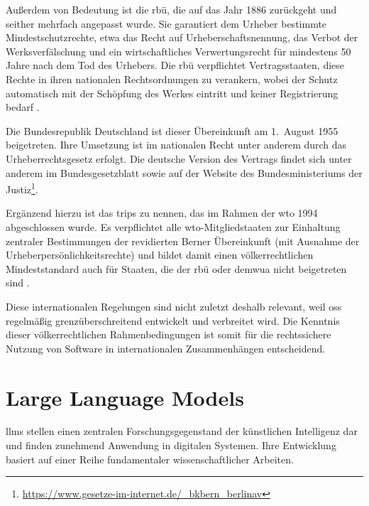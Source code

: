Außerdem von Bedeutung ist die \gls{rbü}, die auf das Jahr 1886 zurückgeht und seither mehrfach angepasst wurde.
Sie garantiert dem Urheber bestimmte Mindestschutzrechte, etwa das Recht auf Urheberschaftsnennung, das Verbot der Werksverfälschung und ein wirtschaftliches Verwertungsrecht für mindestens 50 Jahre nach dem Tod des Urhebers.
Die \gls{rbü} verpflichtet Vertragsstaaten, diese Rechte in ihren nationalen Rechtsordnungen zu verankern, wobei der Schutz automatisch mit der Schöpfung des Werkes eintritt und keiner Registrierung bedarf \autocite{meckel_definition_nodate-1}.

Die Bundesrepublik Deutschland ist dieser Übereinkunft am 1.\ August 1955 beigetreten.
Ihre Umsetzung ist im nationalen Recht unter anderem durch das Urheberrechtsgesetz erfolgt.
Die deutsche Version des Vertrags findet sich unter anderem im Bundesgesetzblatt sowie auf der Website des Bundesministeriums der Justiz\footnote{\url{https://www.gesetze-im-internet.de/\_bkbern\_berlinav}}.

Ergänzend hierzu ist das \gls{trips} zu nennen, das im Rahmen der \gls{wto} 1994 abgeschlossen wurde.
Es verpflichtet alle \gls{wto}-Mitgliedstaaten zur Einhaltung zentraler Bestimmungen der revidierten Berner Übereinkunft (mit Ausnahme der Urheberpersönlichkeitsrechte) und bildet damit einen völkerrechtlichen Mindeststandard auch für Staaten, die der \gls{rbü} oder dem\gls{wua} nicht beigetreten sind \autocite{malbon_standards_2014}.

Diese internationalen Regelungen sind nicht zuletzt deshalb relevant, weil \gls{oss} regelmäßig grenzüberschreitend entwickelt und verbreitet wird.
Die Kenntnis dieser völkerrechtlichen Rahmenbedingungen ist somit für die rechtssichere Nutzung von Software in internationalen Zusammenhängen entscheidend.


\section{Large Language Models}

\glspl{llm} stellen einen zentralen Forschungsgegenstand der künstlichen Intelligenz dar und finden zunehmend Anwendung in digitalen Systemen.
Ihre Entwicklung basiert auf einer Reihe fundamentaler wissenschaftlicher Arbeiten.

